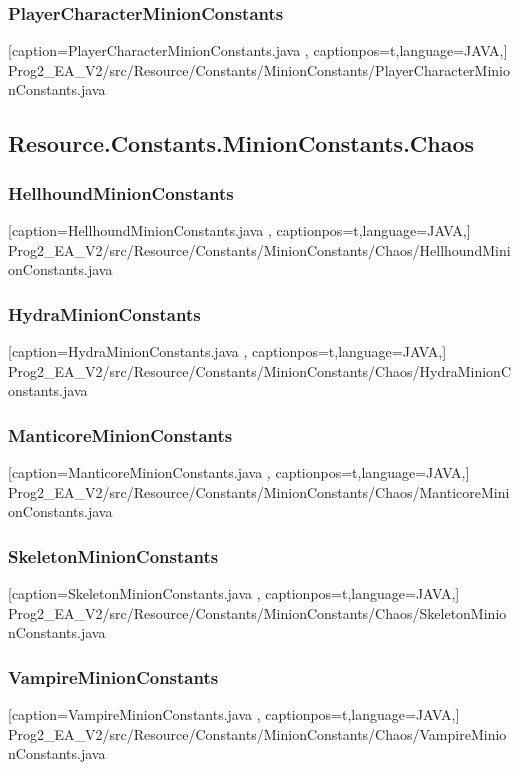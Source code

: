 \documentclass[a4paper,12pt]{scrartcl}
\begin{document}
	\subsubsection{PlayerCharacterMinionConstants}
	
	[caption={PlayerCharacterMinionConstants.java}
	\label{lst:javaclass},
	captionpos=t,language=JAVA,]
	{Prog2_EA_V2/src/Resource/Constants/MinionConstants/PlayerCharacterMinionConstants.java}
	\subsection{Resource.Constants.MinionConstants.Chaos}
	\subsubsection{HellhoundMinionConstants}
	
	[caption={HellhoundMinionConstants.java}
	\label{lst:javaclass},
	captionpos=t,language=JAVA,]
	{Prog2_EA_V2/src/Resource/Constants/MinionConstants/Chaos/HellhoundMinionConstants.java}
	\subsubsection{HydraMinionConstants}
	
	[caption={HydraMinionConstants.java}
	\label{lst:javaclass},
	captionpos=t,language=JAVA,]
	{Prog2_EA_V2/src/Resource/Constants/MinionConstants/Chaos/HydraMinionConstants.java}
	\subsubsection{ManticoreMinionConstants}
	
	[caption={ManticoreMinionConstants.java}
	\label{lst:javaclass},
	captionpos=t,language=JAVA,]
	{Prog2_EA_V2/src/Resource/Constants/MinionConstants/Chaos/ManticoreMinionConstants.java}
	\subsubsection{SkeletonMinionConstants}
	
	[caption={SkeletonMinionConstants.java}
	\label{lst:javaclass},
	captionpos=t,language=JAVA,]
	{Prog2_EA_V2/src/Resource/Constants/MinionConstants/Chaos/SkeletonMinionConstants.java}
	\subsubsection{VampireMinionConstants}
	
	[caption={VampireMinionConstants.java}
	\label{lst:javaclass},
	captionpos=t,language=JAVA,]
	{Prog2_EA_V2/src/Resource/Constants/MinionConstants/Chaos/VampireMinionConstants.java}
\end{document}
